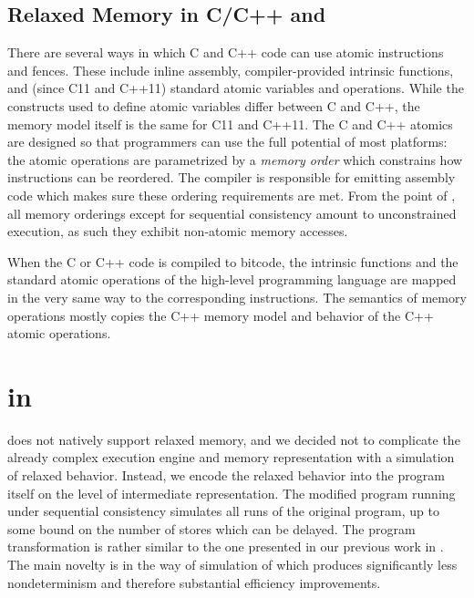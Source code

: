 \subsection{Relaxed Memory in C/C++ and \llvm}

There are several ways in which C and C++ code can use atomic instructions and fences.
These include inline assembly, compiler-provided intrinsic functions, and (since C11 and C++11) standard atomic variables and operations.
While the constructs used to define atomic variables differ between C and C++, the memory model itself is the same for C11 and C++11.
The C and C++ atomics are designed so that programmers can use the full potential of most platforms: the atomic operations are parametrized by a \emph{memory order} which constrains how instructions can be reordered.
The compiler is responsible for emitting assembly code which makes sure these ordering requirements are met.
From the point of \xtso, all memory orderings except for sequential consistency
amount to unconstrained execution, as such they exhibit non-atomic memory accesses.

When the C or C++ code is compiled to \llvm bitcode, the intrinsic functions and
the standard atomic operations of the high-level programming language are mapped
in the very same way to the corresponding \llvm instructions.
The semantics of \llvm memory operations mostly copies the C++ memory model and behavior
of the C++ atomic operations.



\section{\xtso in \divine} \label{sec:work}


\divine does not natively support relaxed memory, and we decided not to complicate the already complex execution engine and memory representation with a simulation of relaxed behavior.
Instead, we encode the relaxed behavior into the program itself on the level of \llvm intermediate representation.
The modified program running under sequential consistency simulates all \xtso runs of the original program, up to some bound on the number of stores which can be delayed.
The program transformation is rather similar to the one presented in our previous work in \cite{SRB15weakmem}.
The main novelty is in the way of simulation of \xtso which produces significantly less nondeterminism and therefore substantial efficiency improvements.

